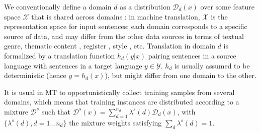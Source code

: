 \documentclass[11pt]{article}
\begin{document}
We conventionally define a domain $d$ as a distribution $\mathcal{D}_d(x)$ over some feature space $\mathcal{X}$ that is shared across domains \citep{Pan10asurvey}: in machine translation, $\mathcal{X}$ is the representation space for input sentences; each domain corresponds to a specific source of data, and may differ from the other data sources in terms of textual genre, thematic content \citep{Chen16guided,Zhang16topicinformed}, register \cite{Sennrich16politeness}, style \cite{Niu18multitask}, etc. Translation in domain $d$ is formalized by a translation function $h_d(y|x)$ pairing sentences in a source language with sentences in a target language $y \in \mathcal{Y}$. $h_d$ is usually assumed to be deterministic (hence $y = h_d(x)$), but might differ from one domain to the other.

It is usual in MT to opportunistically collect training samples from several domains, which means that training instances are distributed according to a mixture $\mathcal{D}^s$ such that $\mathcal{D}^s(x) = \sum_{d=1}^{n_d} \lambda^{s}(d) \mathcal{D}_d(x)$, with $\{\lambda^{s}(d), d=1 \dots n_d\}$ the mixture weights satisfying $\sum_d \lambda^{s}(d)=1$.
\end{document}
